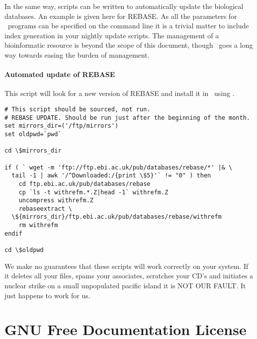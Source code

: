 \documentclass{report}
\begin{document}
In the same way, scripts can be written to automatically update the
biological databases. An example is given here for REBASE. As all the
parameters for \EMBOSS\ programs can be specified on the command line
it is a trivial matter to include index generation in your nightly
update scripts. The management of a bioinformatic resource is beyond
the scope of this document, though \EMBOSS\ goes a long way towards
easing the burden of management.

\subsubsection{Automated update of REBASE}

This script will look for a new version of REBASE and install it in
\EMBOSS\ using .

\begin{verbatim}
# This script should be sourced, not run.
# REBASE UPDATE. Should be run just after the beginning of the month.
set mirrors_dir=('/ftp/mirrors')
set oldpwd=`pwd`

cd \$mirrors_dir

if ( ` wget -m 'ftp://ftp.ebi.ac.uk/pub/databases/rebase/*' |& \
  tail -1 | awk '/^Downloaded:/{print \$5}'` != "0" ) then 
	cd ftp.ebi.ac.uk/pub/databases/rebase
	cp `ls -t withrefm.*.Z|head -1` withrefm.Z
	uncompress withrefm.Z
	rebaseextract \
  \${mirrors_dir}/ftp.ebi.ac.uk/pub/databases/rebase/withrefm 
	rm withrefm
endif 

cd \$oldpwd
\end{verbatim}

We make no guarantees that these scripts will work correctly on your
system. If it deletes all your files, spams your associates, scratches
your CD's and initiates a nuclear strike on a small unpopulated
pacific island it is NOT OUR FAULT.  It just happens to work for us.

\chapter{GNU Free Documentation License}
\end{document}
